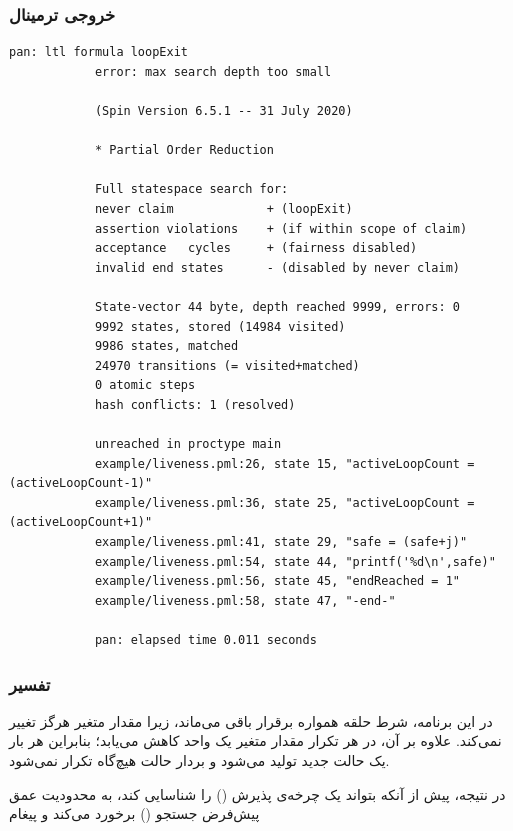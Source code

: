 \documentclass[12pt]{report}
\begin{document}
	\subsubsection{خروجی ترمینال}
	
	\begin{latin}
		\begin{lstlisting}[style=termstyle]
			pan: ltl formula loopExit
			error: max search depth too small
			
			(Spin Version 6.5.1 -- 31 July 2020)
			
			* Partial Order Reduction
			
			Full statespace search for:
			never claim             + (loopExit)
			assertion violations    + (if within scope of claim)
			acceptance   cycles     + (fairness disabled)
			invalid end states      - (disabled by never claim)
			
			State-vector 44 byte, depth reached 9999, errors: 0
			9992 states, stored (14984 visited)
			9986 states, matched
			24970 transitions (= visited+matched)
			0 atomic steps
			hash conflicts: 1 (resolved)
			
			unreached in proctype main
			example/liveness.pml:26, state 15, "activeLoopCount = (activeLoopCount-1)"
			example/liveness.pml:36, state 25, "activeLoopCount = (activeLoopCount+1)"
			example/liveness.pml:41, state 29, "safe = (safe+j)"
			example/liveness.pml:54, state 44, "printf('%d\n',safe)"
			example/liveness.pml:56, state 45, "endReached = 1"
			example/liveness.pml:58, state 47, "-end-"
			
			pan: elapsed time 0.011 seconds
		\end{lstlisting}
	\end{latin}
	
	\subsubsection{تفسیر}
	
	در این برنامه، شرط حلقه همواره برقرار باقی می‌ماند، زیرا مقدار متغیر  هرگز تغییر نمی‌کند. علاوه بر آن، در هر تکرار مقدار متغیر  یک واحد کاهش می‌یابد؛ بنابراین هر بار یک حالت جدید تولید می‌شود و بردار حالت هیچ‌گاه تکرار نمی‌شود.
	
	در نتیجه،  پیش از آنکه بتواند یک چرخه‌ی پذیرش () را شناسایی کند، به محدودیت عمق پیش‌فرض جستجو () برخورد می‌کند و پیغام
	
	\begin{center}
	\end{center}
	
\end{document}
